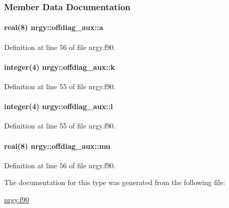 \subsubsection{Member Data Documentation}
\hypertarget{structnrgy_1_1offdiag__aux_a1187f9c7d2863dc0d8ad0008cc9558e3}{
\paragraph[{a}]{\setlength{\rightskip}{0pt plus 5cm}real(8) nrgy\-::offdiag\-\_\-aux\-::a}}\label{structnrgy_1_1offdiag__aux_a1187f9c7d2863dc0d8ad0008cc9558e3}


Definition at line 56 of file nrgy.\-f90.

\hypertarget{structnrgy_1_1offdiag__aux_a8d348e8df33899d1cd598b0e9dd7748a}{
\paragraph[{k}]{\setlength{\rightskip}{0pt plus 5cm}integer(4) nrgy\-::offdiag\-\_\-aux\-::k}}\label{structnrgy_1_1offdiag__aux_a8d348e8df33899d1cd598b0e9dd7748a}


Definition at line 55 of file nrgy.\-f90.

\hypertarget{structnrgy_1_1offdiag__aux_a81e07f9b21718a57326a8c41ee996f08}{
\paragraph[{l}]{\setlength{\rightskip}{0pt plus 5cm}integer(4) nrgy\-::offdiag\-\_\-aux\-::l}}\label{structnrgy_1_1offdiag__aux_a81e07f9b21718a57326a8c41ee996f08}


Definition at line 55 of file nrgy.\-f90.

\hypertarget{structnrgy_1_1offdiag__aux_aa5a8d9ed254f33814659b5133c3f90c6}{
\paragraph[{mu}]{\setlength{\rightskip}{0pt plus 5cm}real(8) nrgy\-::offdiag\-\_\-aux\-::mu}}\label{structnrgy_1_1offdiag__aux_aa5a8d9ed254f33814659b5133c3f90c6}


Definition at line 56 of file nrgy.\-f90.



The documentation for this type was generated from the following file\-:\begin{DoxyCompactItemize}
\item 
\hyperlink{nrgy_8f90}{nrgy.\-f90}\end{DoxyCompactItemize}
